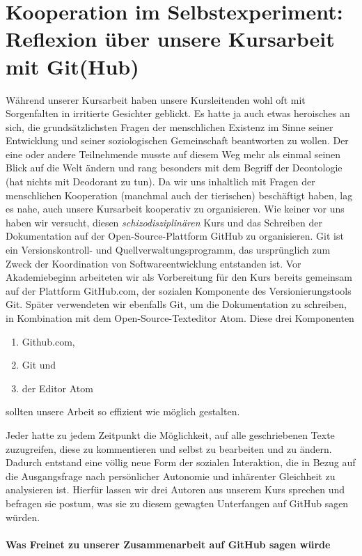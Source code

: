 \section[Kursreflexion]{Kooperation im Selbstexperiment: Reflexion über unsere Kursarbeit mit Git(Hub)}

Während unserer Kursarbeit haben unsere Kursleitenden wohl oft mit Sorgenfalten in irritierte Gesichter geblickt.
Es hatte ja auch etwas heroisches an sich, die grundsätzlichsten Fragen der menschlichen Existenz im Sinne seiner Entwicklung und seiner soziologischen Gemeinschaft beantworten zu wollen.
Der eine oder andere Teilnehmende musste auf diesem Weg mehr als einmal seinen Blick auf die Welt ändern und rang besonders mit dem Begriff der Deontologie (hat nichts mit Deodorant zu tun).
Da wir uns inhaltlich mit Fragen der menschlichen Kooperation (manchmal auch der tierischen) beschäftigt haben, lag es nahe, auch unsere Kursarbeit kooperativ zu organisieren.
Wie keiner vor uns haben wir versucht, diesen \emph{schizodisziplinären} Kurs und das Schreiben der Dokumentation auf der Open-Source-Plattform GitHub zu organisieren.
Git ist ein Versionskontroll- und Quellverwaltungsprogramm, das ursprünglich zum Zweck der Koordination von Softwareentwicklung entstanden ist.
Vor Akademiebeginn arbeiteten wir als Vorbereitung für den Kurs bereits gemeinsam auf der Plattform GitHub.com, der sozialen Komponente des Versionierungstools Git.
Später verwendeten wir ebenfalls Git, um die Dokumentation zu schreiben, in Kombination mit dem Open-Source-Texteditor Atom.
Diese drei Komponenten
\begin{enumerate}
	\item Github.com,
	\item Git und
	\item der Editor Atom
\end{enumerate}
sollten unsere Arbeit so effizient wie möglich gestalten.

Jeder hatte zu jedem Zeitpunkt die Möglichkeit, auf alle geschriebenen Texte zuzugreifen, diese zu kommentieren und selbst zu bearbeiten und zu ändern.
Dadurch entstand eine völlig neue Form der sozialen Interaktion, die in Bezug auf die Ausgangsfrage nach persönlicher Autonomie und inhärenter Gleichheit zu analysieren ist.
Hierfür lassen wir drei Autoren aus unserem Kurs sprechen und befragen sie postum, was sie zu diesem gewagten Unterfangen auf GitHub sagen würden.


\paragraph{Was Freinet zu unserer Zusammenarbeit auf GitHub sagen würde}

